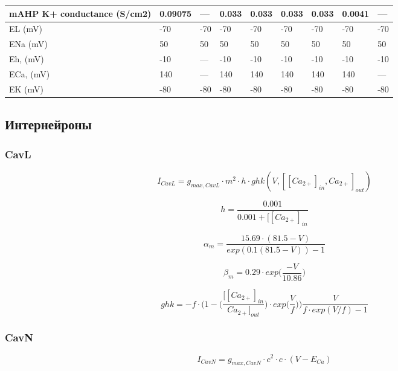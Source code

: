 \documentclass[12pt]{article}
\begin{document}
\begin{table}[h]
\begin{center}
\begin{tabular}{ |p{2cm} | p{1.25cm} |p{1.25cm} |p{1.25cm} |p{1.25cm} |p{1.25cm} |p{1.25cm} |p{1.25cm} |p{1.25cm} | }
mAHP  K+ conductance (S/cm2) & 0.09075 & --- & 0.033 & 0.033 & 0.033 & 0.033 & 0.0041 & --- \\ \hline  EL (mV) & -70 & -70 & -70 & -70 & -70 & -70 & -70 & -70 \\ \hline  ENa (mV) & 50 & 50 & 50 & 50 & 50 & 50 & 50 & 50 \\ \hline  Eh, (mV) & -10 & --- & -10 & -10 & -10 & -10 & -10 & -10 \\ \hline  ECa, (mV) & 140 & --- & 140 & 140 & 140 & 140 & 140 & --- \\ \hline  EK (mV) & -80 & -80 & -80 & -80 & -80 & -80 & -80 & -80 \\ \hline  
			
		\end{tabular}
	\end{center}
\end{table}

\subsection{Интернейроны}
\subsubsection{CavL}
\begin{equation}
I_{CavL} = g_{max, CavL} \cdot m^2 \cdot h \cdot ghk(V, [[Ca_{2+}]_{in}, Ca_{2+}]_{out} )
\end{equation}

\begin{equation}
h = \frac{0.001}{0.001 +[[Ca_{2+}]_{in} }
\end{equation}

\begin{equation}
\alpha_{m} = \frac{15.69 \cdot (81.5-V)}{exp(0.1(81.5-V)) - 1}
\end{equation}

\begin{equation}
\beta_{m} = 0.29 \cdot exp \Big(\frac{-V}{10.86}\Big)
\end{equation}

\begin{equation}
ghk = -f \cdot \Big(1 - \Big(\frac{[[Ca_{2+}]_{in}}{Ca_{2+}]_{out}} \Big) \cdot exp \Big(\frac{V}{f}\Big) \Big) \frac{V}{f \cdot exp(V/f) -1 }
\end{equation}

\subsubsection{CavN}
\begin{equation}
I_{CavN} = g_{max, CavN} \cdot c^2 \cdot c \cdot (V - E_{Ca})
\end{equation}
\end{document}
